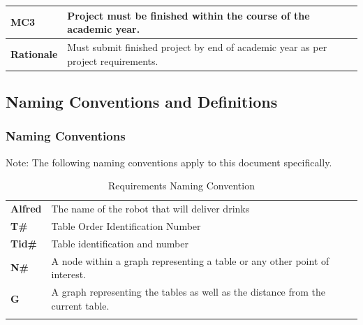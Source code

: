 \documentclass [11pt]{article}
\begin{document}
\begin{longtable}{| p{ } | p{ } | }\hline 
\rowcolor{tableCell}\textbf{MC3} & \textbf{Project must be finished within the course of the academic year.} \\ \hline
\textbf{Rationale} & Must submit finished project by end of academic year as per project requirements.\\ \hline
\end{longtable}

\pagebreak

\subsection{Naming Conventions and Definitions}

\subsubsection{Naming Conventions}
Note: The following naming conventions apply to this document specifically. 

\begin{longtable}{ |p{ }  p{ }|}

\hline
\textbf{Alfred} &  The name of the robot that will deliver drinks \\

\cellcolor{tableCell}\textbf{T\#} &  \cellcolor{tableCell}Table Order Identification Number\\ 

\textbf{Tid\#} & Table identification and number \\

\cellcolor{tableCell}\textbf{N\#}  & \cellcolor{tableCell}A node within a graph representing a table or any other point of interest. \\ 

\textbf{G}  & A graph representing the tables as well as the distance from the current table. \\ \hline

\caption{Requirements Naming Convention}

\end{longtable}

\end{document}
